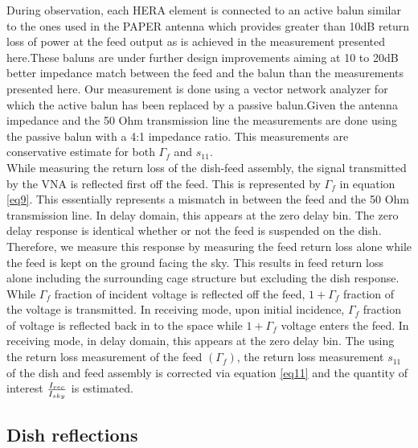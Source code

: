 \documentclass[twocolumn]{emulateapj}
\begin{document}
During observation, each HERA element is connected to an active balun similar
to the ones used in the PAPER antenna which provides greater than 10dB return
loss of power at the feed output as is achieved in the measurement presented
here.These baluns are under further design improvements aiming at 10 to 20dB
better impedance match between the feed and the balun than the measurements
presented here.  Our measurement is done using a vector network analyzer for
which the active balun has been replaced by a passive balun.Given the antenna
impedance and the 50 Ohm transmission line the measurements are done using the
passive balun with a 4:1 impedance ratio. This measurements are conservative
estimate  for both $\Gamma_{f}$ and $s_{11}$.\\ While measuring the return loss
of the dish-feed assembly, the signal transmitted by the VNA is reflected first
off the feed. This is represented by $\Gamma_{f}$ in equation \ref{eq9}. This
essentially represents a mismatch in between the feed and the 50 Ohm
transmission line. In delay domain, this appears at the zero delay bin. The
zero delay response is identical whether or not the feed is suspended on the
dish. Therefore, we measure this response by measuring the feed return loss
alone while the feed is kept on the ground facing the sky. This results in feed
return loss alone including the surrounding cage structure but excluding the
dish response. While $\Gamma_{f}$ fraction of incident voltage is reflected off
the feed, $1+\Gamma_{f}$ fraction of the voltage is transmitted. In receiving
mode, upon initial incidence, $\Gamma_{f}$ fraction of voltage is reflected
back in to the space while $1+\Gamma_{f}$ voltage enters the feed. In receiving
mode, in delay domain, this appears at the zero delay bin.  The using the
return loss measurement of the feed $(\Gamma_{f})$, the return loss measurement
$s_{11}$ of the dish and feed assembly is corrected via equation \ref{eq11} and
the quantity of interest ${I_{rec}\over I_{sky}}$ is estimated. 


\subsection{Dish reflections}
\end{document}
